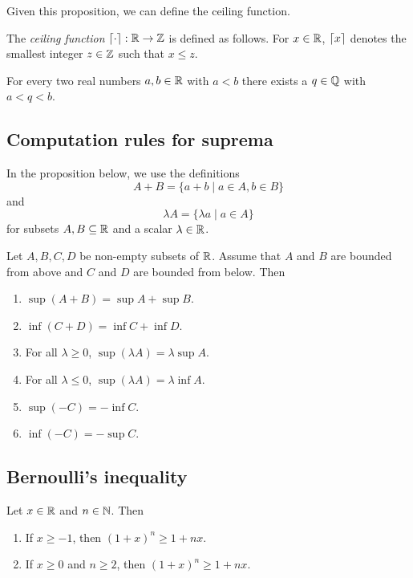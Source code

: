Given this proposition, we can define the ceiling function.

\begin{definition}
    The \emph{ceiling function} $\left\lceil \cdot \right\rceil: \mathbb{R} \to \mathbb{Z}$ is defined as follows. For $x \in \mathbb{R}$, $\left\lceil x \right\rceil$ denotes the smallest integer $z \in \mathbb{Z}$ such that $x \le z$.
\end{definition}

\begin{proposition}
    For every two real numbers $a,b \in \mathbb{R}$ with $a < b$ there exists a $q \in \mathbb{Q}$ with $a < q < b$.
\end{proposition}

\subsection{Computation rules for suprema}
In the proposition below, we use the definitions
$$ A + B = \{a + b \mid a \in A, b \in B\}$$
and 
$$\lambda A = \{\lambda a \mid a \in A\}$$
for subsets $A,B \subseteq \mathbb{R}$ and a scalar $\lambda \in \mathbb{R}$.

\begin{proposition}
    Let $A,B,C,D$ be non-empty subsets of $\mathbb{R}$. Assume that $A$ and $B$ are bounded from above and $C$ and $D$ are bounded from below. Then
    \begin{enumerate}
        \item $\sup(A+B) = \sup A + \sup B$.
        \item $\inf(C+D) = \inf C + \inf D$.
        \item For all $\lambda \ge 0$, $\sup(\lambda A) = \lambda \sup A$.
        \item For all $\lambda \le 0$, $\sup(\lambda A) = \lambda \inf A$.
        \item $\sup(-C) = -\inf C$.
        \item $\inf(-C) = -\sup C$.
    \end{enumerate}
\end{proposition}

\subsection{Bernoulli's inequality}
\begin{proposition}
    Let $x \in \mathbb{R}$ and $n \in \mathbb{N}$. Then
    \begin{enumerate}
        \item If $x \ge -1$, then $(1 + x)^n \ge 1 + nx$.
        \item If $x \ge 0$ and $n \ge 2$, then $(1 + x)^n \ge 1 + nx$.
    \end{enumerate}
\end{proposition}

